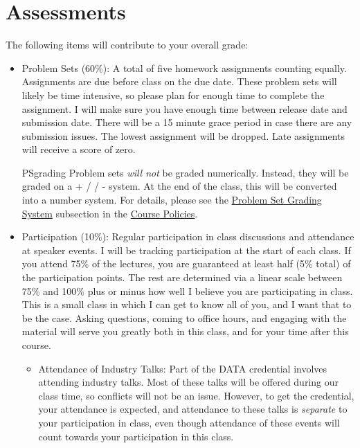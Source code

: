 \documentclass[11pt]{article}
\begin{document}
\section*{Assessments}
The following items will contribute to your overall grade:

\begin{itemize}
    
    \item Problem Sets (60\%): A total of five homework assignments counting equally. Assignments are due before class on the due date. These problem sets will likely be time intensive, so please plan for enough time to complete the assignment. I will make sure you have enough time between release date and submission date. There will be a 15 minute grace period in case there are any submission issues. The lowest assignment will be dropped. Late assignments will receive a score of zero. 
    
    \begin{ToggleSect}{PSgrading}
    Problem sets \textit{will not} be graded numerically. Instead, they will be graded on a \checkmark + / \checkmark / \checkmark - system. At the end of the class, this will be converted into a number system. For details, please see the \hyperref[subsec:PSgrading]{Problem Set Grading System} subsection in the \hyperref[sec:Policies]{Course Policies}.
    \end{ToggleSect}
    
    \item Participation (10\%): Regular participation in class discussions and attendance at speaker events. I will be tracking participation at the start of each class. If you attend 75\% of the lectures, you are guaranteed at least half (5\% total) of the participation points. The rest are determined via a linear scale between 75\% and 100\% plus or minus how well I believe you are participating in class. This is a small class in which I can get to know all of you, and I want that to be the case. Asking questions, coming to office hours, and engaging with the material will serve you greatly both in this class, and for your time after this course.
    
    \begin{itemize}
    	\item Attendance of Industry Talks: Part of the DATA credential involves attending industry talks. Most of these talks will be offered during our class time, so conflicts will not be an issue. However, to get the credential, your attendance is expected, and attendance to these talks is \textit{separate} to your participation in class, even though attendance of these events will count towards your participation in this class.
    \end{itemize}
    

\end{itemize}
\end{document}
